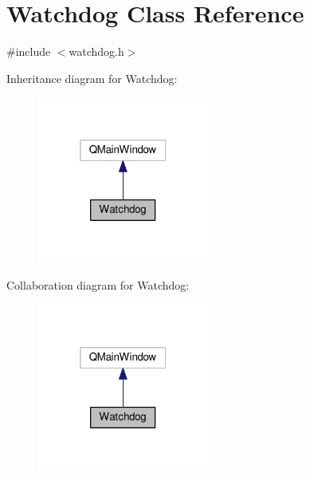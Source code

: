 \hypertarget{classWatchdog}{}\section{Watchdog Class Reference}
\label{classWatchdog}


{\ttfamily \#include $<$watchdog.\+h$>$}



Inheritance diagram for Watchdog\+:
\nopagebreak
\begin{figure}[H]
\begin{center}
\leavevmode
\includegraphics[width=160pt]{classWatchdog__inherit__graph}
\end{center}
\end{figure}


Collaboration diagram for Watchdog\+:
\nopagebreak
\begin{figure}[H]
\begin{center}
\leavevmode
\includegraphics[width=160pt]{classWatchdog__coll__graph}
\end{center}
\end{figure}
